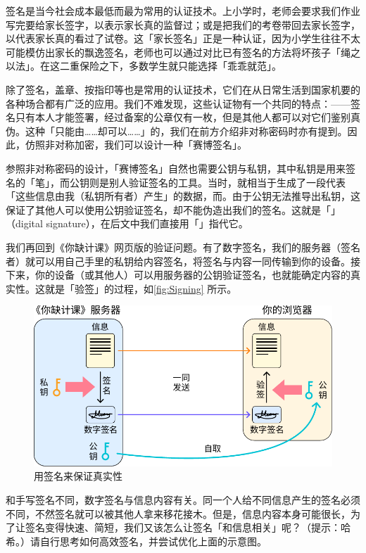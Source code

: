 签名是当今社会成本最低而最为常用的认证技术。上小学时，老师会要求我们作业写完要给家长签字，以表示家长真的监督过；或是把我们的考卷带回去家长签字，以代表家长真的看过了试卷。这「家长签名」正是一种认证，因为小学生往往不太可能模仿出家长的飘逸签名，老师也可以通过对比已有签名的方法将坏孩子「绳之以法」。在这二重保险之下，多数学生就只能选择「乖乖就范」。

除了签名，盖章、按指印等也是常用的认证技术，它们在从日常生活到国家机要的各种场合都有广泛的应用。我们不难发现，这些认证物有一个共同的特点：——签名只有本人才能签署，经过备案的公章仅有一枚，但是其他人都可以对它们鉴别真伪。这种「只能由……却可以……」的，我们在前方介绍非对称密码时亦有提到。因此，仿照非对称加密，我们可以设计一种「赛博签名」。

参照非对称密码的设计，「赛博签名」自然也需要公钥与私钥，其中私钥是用来签名的「笔」，而公钥则是别人验证签名的工具。当时，就相当于生成了一段代表「这些信息由我（私钥所有者）产生」的数据，而。由于公钥无法推导出私钥，这保证了其他人可以使用公钥验证签名，却不能伪造出我们的签名。这就是「」（digital signature），在后文中我们直接用「」指代它。

我们再回到《你缺计课》网页版的验证问题。有了数字签名，我们的服务器（签名者）就可以用自己手里的私钥给内容签名，将签名与内容一同传输到你的设备。接下来，你的设备（或其他人）可以用服务器的公钥验证签名，也就能确定内容的真实性。这就是「验签」的过程，如\autoref{fig:Signing} 所示。

\begin{figure}[htb!]
  \centering
  \includegraphics[width=.65\textwidth]{assets/surpass/Signing.pdf}
  \caption{用签名来保证真实性}
  \label{fig:Signing}
\end{figure}

\begin{note}
  和手写签名不同，数字签名与信息内容有关。同一个人给不同信息产生的签名必须不同，不然签名就可以被其他人拿来移花接木。但是，信息内容本身可能很长，为了让签名变得快速、简短，我们又该怎么让签名「和信息相关」呢？（提示：哈希。）请自行思考如何高效签名，并尝试优化上面的示意图。
\end{note}

